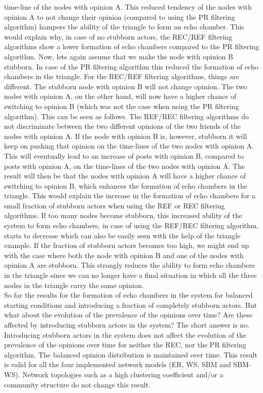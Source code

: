 \documentclass[11 pt , letterpaper , twoside , openright]{book}
\begin{document}
time-line of the nodes with opinion A. This reduced tendency of the nodes with opinion A to not change their opinion (compared to using the PR filtering algorithm) hampers the ability of the triangle to form an echo chamber. This would explain why, in case of no stubborn actors, the REC/REF filtering algorithms show a lower formation of echo chambers compared to the PR filtering algorithm. Now, lets again assume that we make the node with opinion B stubborn. In case of the PR filtering algorithm this reduced the formation of echo chambers in the triangle. For the REC/REF filtering algorithms, things are different. The stubborn node with opinion B will not change opinion. The two nodes with opinion A, on the other hand, will now have a higher chance of switching to opinion B (which was not the case when using the PR filtering algorithm). This can be seen as follows. The REF/REC filtering algorithms do not discriminate between the two different opinions of the two friends of the nodes with opinion A. If the node with opinion B is, however, stubborn it will keep on pushing that opinion on the time-lines of the two nodes with opinion A. This will eventually lead to an increase of posts with opinion B, compared to posts with opinion A, on the time-lines of the two nodes with opinion A. The result will then be that the nodes with opinion A will have a higher chance of switching to opinion B, which enhances the formation of echo chambers in the triangle. This would explain the increase in the formation of echo chambers for a small fraction of stubborn actors when using the REF or REC filtering algorithms. If too many nodes become stubborn, this increased ability of the system to form echo chambers, in case of using the REF/REC filtering algorithm, starts to decrease which can also be easily seen with the help of the triangle example. If the fraction of stubborn actors becomes too high, we might end up with the case where both the node with opinion B and one of the nodes with opinion A are stubborn. This strongly reduces the ability to form echo chambers in the triangle since we can no longer have a final situation in which all the three nodes in the triangle carry the same opinion.\\
\newline
So far the results for the formation of echo chambers in the system for balanced starting conditions and introducing a fraction of completely stubborn actors. But what about the evolution of the prevalence of the opinions over time? Are these affected by introducing stubborn actors in the system? The short answer is no. Introducing stubborn actors in the system does not affect the evolution of the prevalence of the opinions over time for neither the REC, nor the PR filtering algorithm. The balanced opinion distribution is maintained over time. This result is valid for all the four implemented network models (ER, WS, SBM and SBM-WS). Network topologies such as a high clustering coefficient and/or a community structure do not change this result. \\%
\end{document}
